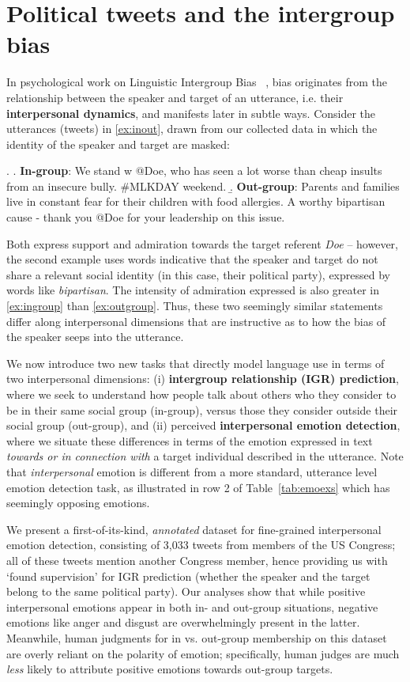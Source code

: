 \chapter{Political tweets and the intergroup bias}
\label{chapter:twitter}

In psychological work on Linguistic Intergroup Bias ~\citep{maass_linguistic_1999}, bias originates from the relationship between the speaker and target of an utterance, i.e. their \textbf{interpersonal dynamics}, and manifests later in  subtle ways. Consider the utterances (tweets) in \ref{ex:inout}, drawn from our collected data in which the identity of the speaker and target are masked:

\ex.
\label{ex:inout} \a.\label{ex:ingroup} \textbf{In-group}: We stand w\/ @Doe, who has seen a lot worse than cheap insults from an insecure bully. \#MLKDAY weekend.
\b.\label{ex:outgroup} \textbf{Out-group}: Parents and families live in constant fear for their children with food allergies. A worthy bipartisan cause - thank you @Doe for your leadership on this issue.


\noindent Both express support and admiration towards the target referent \emph{Doe} -- however, the second example uses words indicative that the speaker and target do not share a relevant social identity (in this case, their political party), expressed by words like \emph{bipartisan}. The intensity of admiration expressed is also greater in \ref{ex:ingroup} than \ref{ex:outgroup}. Thus, these two seemingly similar statements differ along interpersonal dimensions that are instructive as to how the bias of the speaker seeps into the utterance.

We now introduce two new tasks that directly model language use in terms of two interpersonal dimensions: (i) \textbf{intergroup relationship (IGR) prediction}, where we seek to understand how people talk about others who they consider to be in their same social group (in-group), versus those they consider outside their social group (out-group), and (ii) perceived \textbf{interpersonal emotion detection}, where we situate these differences in terms of the emotion expressed in text \emph{towards or in connection with} a target individual described in the utterance. Note that \emph{interpersonal} emotion is different from a more standard, utterance level emotion detection task, as illustrated in row 2 of Table~\ref{tab:emoexs} which has seemingly opposing emotions.

We present a first-of-its-kind, \emph{annotated} dataset for fine-grained interpersonal emotion detection, consisting of 3,033 tweets from members of the US Congress; all of these tweets mention another Congress member, hence providing us with `found supervision' for IGR prediction (whether the speaker and the target belong to the same political party). Our analyses show that while positive interpersonal emotions appear in both in- and out-group situations, negative emotions like anger and disgust are overwhelmingly present in the latter. Meanwhile, human judgments for in vs. out-group membership on this dataset are overly reliant on the polarity of emotion; specifically, human judges are much \emph{less} likely to attribute positive emotions towards out-group targets.

